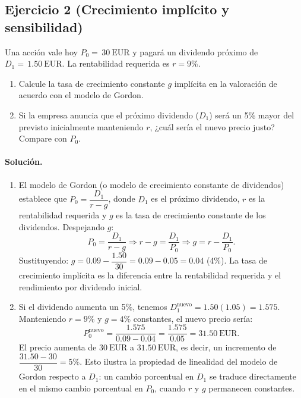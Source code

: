 \documentclass[12pt,a4paper]{article}
\newcommand{\EUR}[1]{\ensuremath{#1~\text{EUR}}}
\newenvironment{ejercicio}[1]{\subsection*{Ejercicio #1}}{}
\newenvironment{solucion}{\paragraph{Solución.}}{}
\begin{document}
\begin{ejercicio}{2 (Crecimiento implícito y sensibilidad)}
Una acción vale hoy $P_0=\,\EUR{30}$ y pagará un dividendo próximo de $D_1=\,\EUR{1.50}$. La rentabilidad requerida es $r=9\%$.
\begin{enumerate}[label=\alph*)]
  \item Calcule la tasa de crecimiento constante $g$ implícita en la valoración de acuerdo con el modelo de Gordon.
  \item Si la empresa anuncia que el próximo dividendo ($D_1$) será un 5\% mayor del previsto inicialmente manteniendo $r$, ¿cuál sería el nuevo precio justo? Compare con $P_0$.
\end{enumerate}
\end{ejercicio}
\begin{solucion}
\begin{enumerate}[label=\alph*)]
  \item El modelo de Gordon (o modelo de crecimiento constante de dividendos) establece que $P_0 = \dfrac{D_1}{r-g}$, donde $D_1$ es el próximo dividendo, $r$ es la rentabilidad requerida y $g$ es la tasa de crecimiento constante de los dividendos. Despejando $g$:
  \[
  P_0 = \frac{D_1}{r-g} \Rightarrow r-g = \frac{D_1}{P_0} \Rightarrow g = r - \frac{D_1}{P_0}.
  \]
  Sustituyendo: $g = 0.09 - \dfrac{1.50}{30} = 0.09 - 0.05 = 0.04$ (4\%). La tasa de crecimiento implícita es la diferencia entre la rentabilidad requerida y el rendimiento por dividendo inicial.
  
  \item Si el dividendo aumenta un 5\%, tenemos $D_1^{\text{nuevo}} = 1.50(1.05) = 1.575$. Manteniendo $r=9\%$ y $g=4\%$ constantes, el nuevo precio sería:
  \[
  P_0^{\text{nuevo}} = \frac{1.575}{0.09 - 0.04} = \frac{1.575}{0.05} = \EUR{31.50}.
  \]
  El precio aumenta de \EUR{30} a \EUR{31.50}, es decir, un incremento de $\dfrac{31.50-30}{30} = 5\%$. Esto ilustra la propiedad de linealidad del modelo de Gordon respecto a $D_1$: un cambio porcentual en $D_1$ se traduce directamente en el mismo cambio porcentual en $P_0$, cuando $r$ y $g$ permanecen constantes.
\end{enumerate}
\end{solucion}
\end{document}
